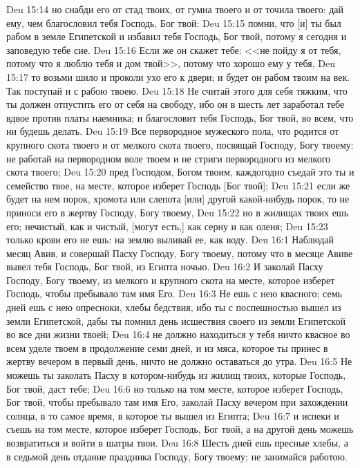 \vs Deu 15:14 но снабди его от стад твоих, от гумна твоего и от точила твоего: дай ему, чем благословил тебя Господь, Бог твой:
\vs Deu 15:15 помни, что [и] ты был рабом в земле Египетской и избавил тебя Господь, Бог твой, потому я сегодня и заповедую тебе сие.
\vs Deu 15:16 Если же он скажет тебе: <<не пойду я от тебя, потому что я люблю тебя и дом твой>>, потому что хорошо ему у тебя,
\vs Deu 15:17 то возьми шило и проколи ухо его к двери; и будет он рабом твоим на век. Так поступай и с рабою твоею.
\vs Deu 15:18 Не считай этого для себя тяжким, что ты должен отпустить его от себя на свободу, ибо он в шесть лет заработал тебе вдвое против платы наемника; и благословит тебя Господь, Бог твой, во всем, что ни будешь делать.
\rsbpar\vs Deu 15:19 Все первородное мужеского пола, что родится от крупного скота твоего и от мелкого скота твоего, посвящай Господу, Богу твоему: не работай на первородном воле твоем и не стриги первородного из мелкого скота твоего;
\vs Deu 15:20 пред Господом, Богом твоим, каждогодно съедай это ты и семейство твое, на месте, которое изберет Господь [Бог твой];
\vs Deu 15:21 если же будет на нем порок, хромота или слепота [или] другой какой-нибудь порок, то не приноси его в жертву Господу, Богу твоему,
\vs Deu 15:22 но в жилищах твоих ешь его; нечистый, как и чистый, [могут есть,] как серну и как оленя;
\vs Deu 15:23 только крови его не ешь: на землю выливай ее, как воду.
\vs Deu 16:1 Наблюдай месяц Авив, и совершай Пасху Господу, Богу твоему, потому что в месяце Авиве вывел тебя Господь, Бог твой, из Египта ночью.
\vs Deu 16:2 И заколай Пасху Господу, Богу твоему, из мелкого и крупного скота на месте, которое изберет Господь, чтобы пребывало там имя Его.
\vs Deu 16:3 Не ешь с нею квасного; семь дней ешь с нею опресноки, хлебы бедствия, ибо ты с поспешностью вышел из земли Египетской, дабы ты помнил день исшествия своего из земли Египетской во все дни жизни твоей;
\vs Deu 16:4 не должно находиться у тебя ничто квасное во всем уделе твоем в продолжение семи дней, и из мяса, которое ты принес в жертву вечером в первый день, ничто не должно оставаться до утра.
\vs Deu 16:5 Не можешь ты заколать Пасху в котором-нибудь из жилищ твоих, которые Господь, Бог твой, даст тебе;
\vs Deu 16:6 но только на том месте, которое изберет Господь, Бог твой, чтобы пребывало там имя Его, заколай Пасху вечером при захождении солнца, в то самое время, в которое ты вышел из Египта;
\vs Deu 16:7 и испеки и съешь на том месте, которое изберет Господь, Бог твой, а на другой день можешь возвратиться и войти в шатры твои.
\vs Deu 16:8 Шесть дней ешь пресные хлебы, а в седьмой день отдание праздника Господу, Богу твоему; не занимайся работою.
